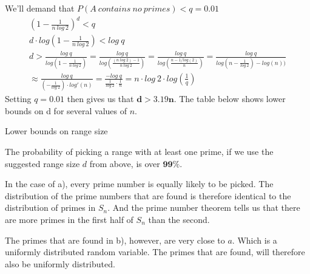 \documentclass[12pt,a4paper]{article}
\begin{document}
\begin{enumerate}[a)]
    We'll demand that \(P(A\ contains\ no\ primes) < q = 0.01\)
    \begin{gather*}
        \left(1-\frac{1}{n\ log\ 2}\right)^d < q \\
        d \cdot log\left(1-\frac{1}{n\ log\ 2}\right) < log\ q \\
        d > \frac{log\ q}{log\left(1-\frac{1}{n\ log\ 2}\right)} =
        \frac{log\ q}{log\left(\frac{(n\ log\ 2) - 1}{n\ log\ 2}\right)} =
        \frac{log\ q}{log\left(\frac{n - 1/log(2)}{n}\right)} =
        \frac{log\ q}{log(n - \frac{1}{log\ 2}) - log(n))} \\
        \approx \frac{log\ q}{\left(-\frac{1}{log\ 2}\right) \cdot log'(n)} =
        \frac{- log\ q}{\frac{1}{log\ 2} \cdot \frac{1}{n}} =
        n \cdot log\ 2 \cdot log\left( \frac{1}{q} \right)
    \end{gather*}
    Setting \(q = 0.01\) then gives us that \(\mathbf{d > 3.19n}\).
    The table below shows lower bounds on d for several values of \(n\).
        {\begin{table}[H]
             \centering
             \caption{Lower bounds on range size}
             \label{tab:lower_bounds_for_d}
             
        \end{table}}

    The probability of picking a range with at least one prime, if we use the suggested range size \(d\) from above,
    is over \(\mathbf{99\%}\).

    In the case of a), every prime number is equally likely to be picked.
    The distribution of the prime numbers that are found is therefore identical to the distribution of primes in
    \(S_n\).
    And the prime number theorem tells us that there are more primes in the first half of \(S_n\) than the second.

    The primes that are found in b), however, are very close to \(a\).
    Which is a uniformly distributed random variable.
    The primes that are found, will therefore also be uniformly distributed.


\end{enumerate}
\end{document}
